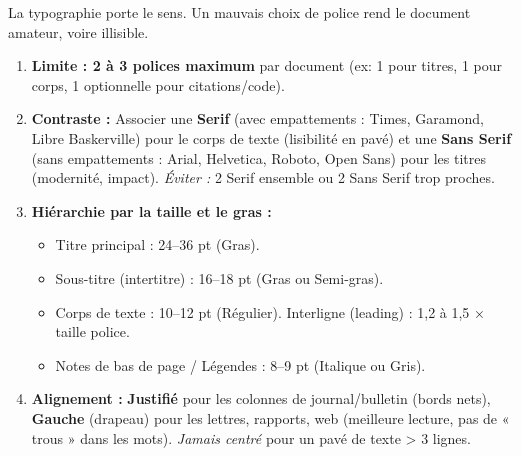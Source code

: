 \documentclass[11pt]{article}
\begin{document}
La typographie porte le sens. Un mauvais choix de police rend le document amateur, voire illisible.

\begin{propriete}
\begin{enumerate}
    \item \textbf{Limite : 2 à 3 polices maximum} par document (ex: 1 pour titres, 1 pour corps, 1 optionnelle pour citations/code).
    \item \textbf{Contraste :} Associer une \textbf{Serif} (avec empattements : Times, Garamond, Libre Baskerville) pour le corps de texte (lisibilité en pavé) et une \textbf{Sans Serif} (sans empattements : Arial, Helvetica, Roboto, Open Sans) pour les titres (modernité, impact). \textit{Éviter :} 2 Serif ensemble ou 2 Sans Serif trop proches.
    \item \textbf{Hiérarchie par la taille et le gras :}
    \begin{itemize}
        \item Titre principal : 24–36 pt (Gras).
        \item Sous-titre (intertitre) : 16–18 pt (Gras ou Semi-gras).
        \item Corps de texte : 10–12 pt (Régulier). Interligne (leading) : 1,2 à 1,5 × taille police.
        \item Notes de bas de page / Légendes : 8–9 pt (Italique ou Gris).
    \end{itemize}
    \item \textbf{Alignement :} \textbf{Justifié} pour les colonnes de journal/bulletin (bords nets), \textbf{Gauche} (drapeau) pour les lettres, rapports, web (meilleure lecture, pas de « trous » dans les mots). \textit{Jamais centré} pour un pavé de texte > 3 lignes.
\end{enumerate}
\end{propriete}
\end{document}
